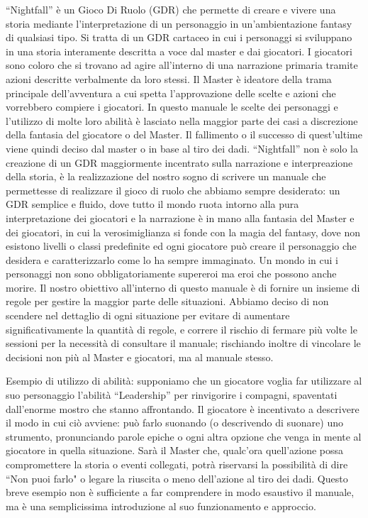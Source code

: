 \documentclass[../manuale_main.tex]{subfiles}
\begin{document}
“Nightfall” è un Gioco Di Ruolo (GDR) che permette di creare e vivere una storia mediante l'interpretazione di un personaggio in un’ambientazione fantasy di qualsiasi tipo. Si tratta di un GDR cartaceo in cui i personaggi si sviluppano in una storia interamente descritta a voce dal master e dai giocatori. I giocatori sono coloro che si trovano ad agire all'interno di una narrazione primaria tramite azioni descritte verbalmente da loro stessi. Il Master è ideatore della trama principale dell'avventura a cui spetta l'approvazione delle scelte e azioni che vorrebbero compiere i giocatori.
In questo manuale le scelte dei personaggi e l'utilizzo di molte loro abilità è lasciato nella maggior parte dei casi a discrezione della fantasia del giocatore o del Master. Il fallimento o il successo di quest'ultime viene quindi deciso dal master o in base al tiro dei dadi.
“Nightfall”  non è solo la creazione di un GDR maggiormente incentrato sulla narrazione e interpreazione della storia, è la realizzazione del nostro sogno di scrivere un manuale che permettesse di realizzare il gioco di ruolo che abbiamo sempre desiderato: un  GDR semplice e fluido, dove tutto il mondo ruota intorno alla pura interpretazione dei giocatori e la narrazione è in mano alla fantasia del Master e dei giocatori, in cui la verosimiglianza si fonde con la magia del fantasy, dove non esistono livelli o classi predefinite ed ogni giocatore può creare il personaggio che desidera e caratterizzarlo come lo ha sempre immaginato. Un mondo in cui i personaggi non sono obbligatoriamente supereroi ma eroi che possono anche morire.
Il nostro obiettivo all'interno di questo manuale è di fornire un insieme di regole per gestire la maggior parte delle situazioni. Abbiamo deciso di non scendere nel dettaglio di ogni situazione per evitare di aumentare significativamente la quantità di regole, e correre il rischio di fermare più volte le sessioni  per la necessità di  consultare il manuale; rischiando inoltre di vincolare le decisioni non più al Master e giocatori, ma al manuale stesso.

Esempio di utilizzo di abilità:
supponiamo che un giocatore voglia far utilizzare al suo personaggio l’abilità  “Leadership” per rinvigorire i compagni, spaventati dall’enorme mostro che stanno affrontando. 
Il giocatore è incentivato a descrivere il modo in cui ciò avviene: può farlo suonando (o descrivendo di suonare) uno strumento, pronunciando parole epiche o ogni altra opzione che venga in mente al giocatore in quella situazione. Sarà il Master che, qualc'ora quell'azione possa compromettere la storia o eventi collegati, potrà riservarsi la possibilità di dire “Non puoi farlo" o legare la riuscita o meno dell'azione al tiro dei dadi. 
Questo breve esempio non è sufficiente a far comprendere in modo esaustivo il manuale, ma è una semplicissima introduzione al suo funzionamento e approccio.
\end{document}
